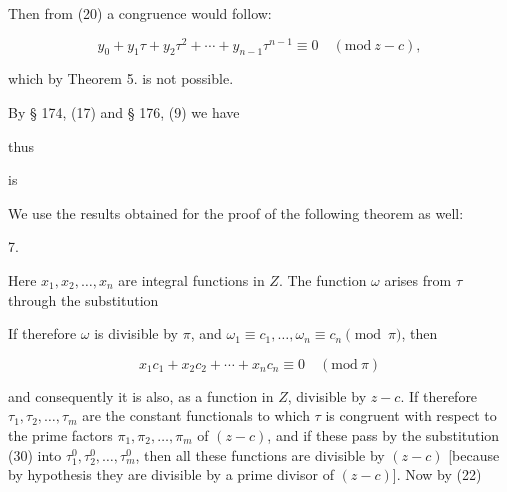 
Then from (20) a congruence would follow:

\[ y_0 + y_1\tau + y_2\tau^2 + \cdots + y_{n-1}\tau^{n-1} \equiv 0 \quad (\mathrm{mod}\ z-c), \]

which by Theorem 5. is not possible.

By § 174, (17) and § 176, (9) we have


thus


is 

We use the results obtained for the proof of the following theorem as
well:

7. 



Here $x_1, x_2, \ldots, x_n$ are integral functions in $Z$. The function
$\omega$ arises from $\tau$ through the substitution


If therefore $\omega$ is divisible by $\pi$, and $\omega_1 \equiv c_1,
\ldots, \omega_n \equiv c_n \pmod{\pi}$, then

\[ x_1c_1 + x_2c_2 + \cdots + x_nc_n \equiv 0 \quad (\mathrm{mod}\ \pi) \]

and consequently it is also, as a function in $Z$, divisible by $z-c$. If
therefore $\tau_1, \tau_2, \ldots, \tau_m$ are the constant functionals
to which $\tau$ is congruent with respect to the prime factors $\pi_1,
\pi_2, \ldots, \pi_m$ of $(z-c)$, and if these pass by the substitution
(30) into $\tau_1^0, \tau_2^0, \ldots, \tau_m^0$, then all these
functions are divisible by $(z-c)$ [because by hypothesis they are
divisible by a prime divisor of $(z-c)$]. Now by (22)

